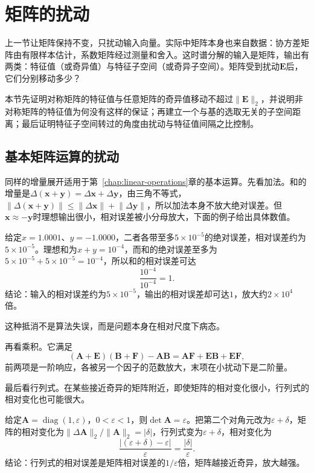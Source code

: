 
\section{矩阵的扰动}
\label{sec:ls-spectral-sensitivity}
\label{sec:linear-algebra-spectral-stability}
\label{sec:ch06-spectral-stability}

上一节让矩阵保持不变，只扰动输入向量。实际中矩阵本身也来自数据：协方差矩阵由有限样本估计，系数矩阵经过测量和舍入。这时谱分解的输入是矩阵，输出有两类：特征值（或奇异值）与特征子空间（或奇异子空间）。矩阵受到扰动$\bm E$后，它们分别移动多少？

本节先证明对称矩阵的特征值与任意矩阵的奇异值移动不超过$\lVert\bm E\rVert_2$，并说明非对称矩阵的特征值为何没有这样的保证；再建立一个与基的选取无关的子空间距离；最后证明特征子空间转过的角度由扰动与特征值间隔之比控制。

\subsection{基本矩阵运算的扰动}

同样的增量展开适用于第~\ref{chap:linear-operations}章的基本运算。先看加法。和的增量是$\Delta(\bm x+\bm y)=\Delta\bm x+\Delta\bm y$，由三角不等式，$\lVert\Delta(\bm x+\bm y)\rVert\leq\lVert\Delta\bm x\rVert+\lVert\Delta\bm y\rVert$，所以加法本身不放大绝对误差。但$\bm x\approx-\bm y$时理想输出很小，相对误差被小分母放大，下面的例子给出具体数值。
\begin{example}[加法中的抵消]
\label{ex:ls-cancellation-relative-error}
给定$x=1.0001$、$y=-1.0000$，二者各带至多$5\times10^{-5}$的绝对误差，相对误差约为$5\times10^{-5}$。理想和为$x+y=10^{-4}$，而和的绝对误差至多为$5\times10^{-5}+5\times10^{-5}=10^{-4}$，所以和的相对误差可达
\[
 \frac{10^{-4}}{10^{-4}}=1 .
\]
结论：输入的相对误差约为$5\times10^{-5}$，输出的相对误差却可达$1$，放大约$2\times10^4$倍。
\end{example}
这种抵消不是算法失误，而是问题本身在相对尺度下病态。

再看乘积。它满足
\[
 (\bm A+\bm E)(\bm B+\bm F)-\bm A\bm B=\bm A\bm F+\bm E\bm B+\bm E\bm F,
\]
前两项是一阶响应，各被另一个因子的范数放大，末项在小扰动下是二阶量。

最后看行列式。在某些接近奇异的矩阵附近，即使矩阵的相对变化很小，行列式的相对变化也可能很大。
\begin{example}[接近奇异时的行列式]
\label{ex:ls-determinant-near-singular}
给定$\bm A=\operatorname{diag}(1,\varepsilon)$，$0<\varepsilon<1$，则$\det\bm A=\varepsilon$。把第二个对角元改为$\varepsilon+\delta$，矩阵的相对变化为$\lVert\Delta\bm A\rVert_2/\lVert\bm A\rVert_2=|\delta|$，行列式变为$\varepsilon+\delta$，相对变化为
\[
 \frac{|(\varepsilon+\delta)-\varepsilon|}{\varepsilon}=\frac{|\delta|}{\varepsilon}.
\]
结论：行列式的相对误差是矩阵相对误差的$1/\varepsilon$倍，矩阵越接近奇异，放大越强。
\end{example}

